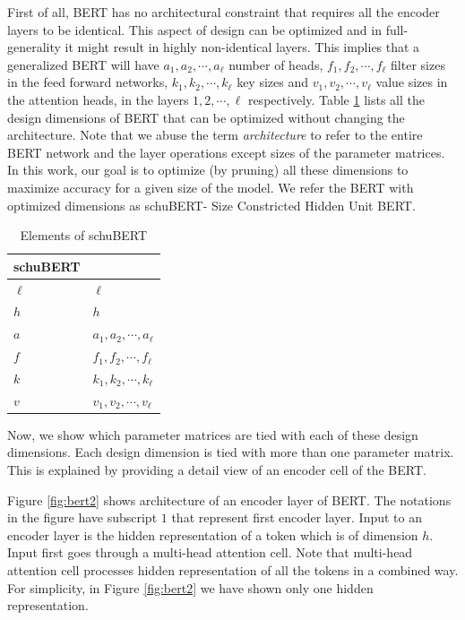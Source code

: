 \documentclass[11pt,a4paper]{article}
\begin{document}
First of all, BERT has no architectural constraint that requires all the encoder layers to be identical. This aspect of design can be optimized and in full-generality it might result in highly non-identical layers. This implies that a generalized BERT will have $a_1, a_2, \cdots, a_\ell$ number of heads, $f_1, f_2, \cdots, f_\ell$ filter sizes in the feed forward networks, $k_{1}, k_{2}, \cdots, k_{\ell}$ key sizes and $v_{1}, v_{2}, \cdots, v_{\ell}$ value sizes in the attention heads, in the layers $1, 2, \cdots, \ell$ respectively.  Table \ref{tab:elem2} lists all the design dimensions of BERT that can be optimized without changing the architecture. Note that we abuse the term {\em architecture} to refer to the entire BERT network and the layer operations except sizes of the parameter matrices. In this work, our goal is to optimize (by pruning) all these dimensions to maximize accuracy for a given size of the model. We refer the BERT with optimized dimensions as schuBERT- Size Constricted Hidden Unit BERT.
\begin{table}
\begin{center}
\begin{tabular}{ll}
schuBERT \\
\hline
$\ell$ & $\ell$ \\
$h$ & $h$ \\
$a$ & $a_1, a_2, \cdots, a_{\ell}$ \\
$f$ & $f_1, f_2, \cdots, f_{\ell}$ \\
$k$ & $k_{1}, k_{2}, \cdots, k_{\ell}$ \\
$v$ & $v_{1}, v_{2}, \cdots, v_{\ell}$
\end{tabular}
\end{center}
\caption{\label{tab:elem2} Elements of schuBERT}
\end{table}

Now, we show which parameter matrices are tied with each of these design dimensions. Each design dimension is tied with more than one parameter matrix. This is explained by providing a detail view of an encoder cell of the BERT. 

Figure \ref{fig:bert2} shows architecture of an encoder layer of BERT. The notations in the figure have subscript $1$ that represent first encoder layer. Input to an encoder layer is the hidden representation of a token which is of dimension $h$. Input first goes through a multi-head attention cell. Note that multi-head attention cell processes hidden representation of all the tokens in a combined way. For simplicity, in Figure \ref{fig:bert2} we have shown only one hidden representation.
\end{document}
